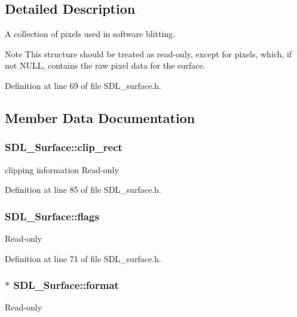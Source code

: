 \subsection{Detailed Description}
A collection of pixels used in software blitting. 

\begin{DoxyNote}{Note}
This structure should be treated as read-\/only, except for {\ttfamily pixels}, which, if not N\-U\-L\-L, contains the raw pixel data for the surface. 
\end{DoxyNote}


Definition at line 69 of file S\-D\-L\-\_\-surface.\-h.



\subsection{Member Data Documentation}
\hypertarget{struct_s_d_l___surface_aa9a0da3b38261dad6cf0cc4e3bb5b0c3}{
\subsubsection[{clip\-\_\-rect}]{ S\-D\-L\-\_\-\-Surface\-::clip\-\_\-rect}}\label{struct_s_d_l___surface_aa9a0da3b38261dad6cf0cc4e3bb5b0c3}
clipping information Read-\/only 

Definition at line 85 of file S\-D\-L\-\_\-surface.\-h.

\hypertarget{struct_s_d_l___surface_a86d78b665d5dfd7aa1dd9696b067641b}{
\subsubsection[{flags}]{ S\-D\-L\-\_\-\-Surface\-::flags}}\label{struct_s_d_l___surface_a86d78b665d5dfd7aa1dd9696b067641b}
Read-\/only 

Definition at line 71 of file S\-D\-L\-\_\-surface.\-h.

\hypertarget{struct_s_d_l___surface_a0a90721f947c10c3b79e02ccb419ca62}{
\subsubsection[{format}]{$\ast$ S\-D\-L\-\_\-\-Surface\-::format}}\label{struct_s_d_l___surface_a0a90721f947c10c3b79e02ccb419ca62}
Read-\/only 


